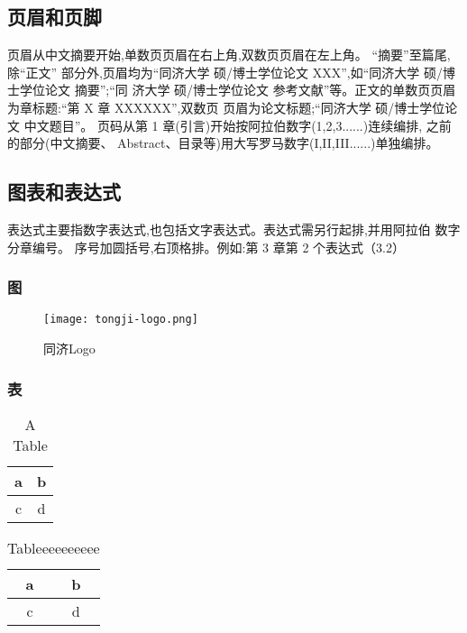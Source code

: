 	\subsection{页眉和页脚}
	页眉从中文摘要开始,单数页页眉在右上角,双数页页眉在左上角。
	“摘要”至篇尾,除“正文” 部分外,页眉均为“同济大学 
	硕/博士学位论文 XXX”,如“同济大学 硕/博士学位论文 摘要”;“同 济大学
	 硕/博士学位论文 参考文献”等。正文的单数页页眉为章标题:“第 X 章
	  XXXXXX”,双数页 页眉为论文标题;“同济大学 硕/博士学位论文 中文题目”。
页码从第 1 章(引言)开始按阿拉伯数字(1,2,3......)连续编排,
之前的部分(中文摘要、 Abstract、目录等)用大写罗马数字(I,II,III......)单独编排。



\subsection{图表和表达式}
	表达式主要指数字表达式,也包括文字表达式。表达式需另行起排,并用阿拉伯
	数字分章编号。 序号加圆括号,右顶格排。例如:第 3 章第 2 个表达式（3.2）
	
\subsubsection{图}
	\begin{figure}[h!]
		\centering
		\texttt{[image: tongji-logo.png]}
		\caption{同济Logo}
		\label{fig:tongji}
	\end{figure}

\subsubsection{表}
		\begin{table}[h!]
		\centering
			\caption{A Table}
			\begin{tabular}{c|c}
			a & b \\ \hline
			c & d \\ \hline
			\end{tabular}
		\end{table}
		
		\begin{table}[h!]
			\centering
				\caption{Tableeeeeeeeee}
				\label{tb:test_tb}
				\begin{tabular}{c|c}
				a & b \\ \hline
				c & d \\ \hline
				\end{tabular}
			\end{table}
	
